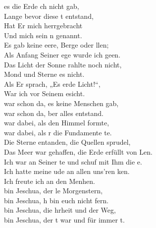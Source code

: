 
 es die Erde ch nicht gab, \\
Lange bevor diese t entstand,\\
Hat Er mich herrgebracht\\
Und mich sein n genannt.\\
Es gab keine eere, Berge oder llen;\\
Als Anfang Seiner ege wurde ich geen.\\
Das Licht der Sonne rahlte noch nicht,\\
Mond und Sterne  es nicht.\\
Als Er sprach, „Es erde Licht!“,\\
War ich vor Seinem esicht.\\

 war schon da,  es keine Menschen gab,\\
 war schon da, ber alles entstand.\\
 war dabei, als  den Himmel formte,\\
 war dabei, als r die Fundamente te.\\

Die Sterne entanden, die Quellen sprudel,\\
Das Meer war gehaffen, die Erde erfüllt von Len.\\
Ich war an Seiner te und schuf mit Ihm die e.\\
Ich hatte meine ude an allen uns'ren ken.\\
Ich freute ich an den Menhen.\\

 bin Jeschua, der le Morgenstern,\\
 bin Jeschua, h bin euch nicht fern.\\
 bin Jeschua, die hrheit und der Weg,\\
 bin Jeschua, der t war und für immer t.\\

